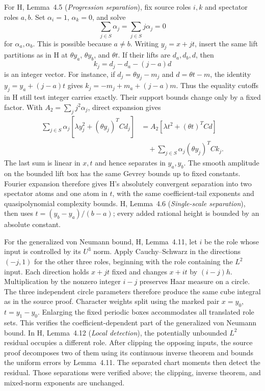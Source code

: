 For H, Lemma~4.5 (\emph{Progression separation}), fix source roles $i,k$
and spectator roles $a,b$.  Set $\alpha_i=1$, $\alpha_k=0$, and solve
\[
 \sum_{j\in S}\alpha_j=\sum_{j\in S}j\alpha_j=0
\]
for $\alpha_a,\alpha_b$.  This is possible because $a\ne b$.
Writing $y_j=x+jt$, insert the same lift partitions as in H at
$\theta y_a$, $\theta y_b$, and $\theta t$.  If their lifts are
$d_a,d_b,d$, then
\[
 k_j=d_j-d_a-(j-a)d
\]
is an integer vector.  For instance, if $d_j=\theta y_j-m_j$ and
$d=\theta t-m$, the identity $y_j=y_a+(j-a)t$ gives
$k_j=-m_j+m_a+(j-a)m$.  Thus the equality cutoffs in H still test
integer carries exactly.  Their support bounds change only by a
fixed factor.  With $A_2=\sum_jj^2\alpha_j$, direct expansion gives
\begin{equation}
 \begin{split}
 \sum_{j\in S}\alpha_j
       [\lambda y_j^2+(\theta y_j)^TCd_j]
 &=A_2[\lambda t^2+(\theta t)^TCd]\\
 &\quad+\sum_{j\in S}\alpha_j(\theta y_j)^TCk_j.
 \end{split}
 \label{eq:ll-chart-identity}
\end{equation}
The last sum is linear in $x,t$ and hence separates in $y_a,y_b$.
The smooth amplitude on the bounded lift box has the same Gevrey
bounds up to fixed constants.  Fourier expansion therefore gives
H's absolutely convergent separation into two spectator atoms and one
atom in $t$, with the same coefficient-tail exponents and
quasipolynomial complexity bounds.  H, Lemma~4.6 (\emph{Single-scale separation}), then uses $t=(y_b-y_a)/(b-a)$; every added rational height is
bounded by an absolute constant.

For the generalized von Neumann bound, H, Lemma~4.11, let $i$ be
the role whose input is controlled by its $U^3$ norm.
Apply Cauchy--Schwarz in the directions $(-j,1)$ for the other
three roles, beginning with the role containing the $L^2$ input.
Each direction holds $x+jt$ fixed and changes $x+it$ by
$(i-j)h$.  Multiplication by the nonzero integer $i-j$ preserves Haar
measure on a circle.  The three independent circle parameters
therefore produce the same cube integral as in the source proof.
Character weights split using the marked pair $x=y_0$,
$t=y_1-y_0$.  Enlarging the fixed periodic boxes accommodates all
translated role sets.  This verifies the coefficient-dependent part
of the generalized von Neumann bound.  In H, Lemma~4.12
(\emph{Local detection}), the potentially unbounded $L^2$ residual
occupies a different role.  After clipping the opposing inputs, the
source proof decomposes two of them using its continuous inverse
theorem and bounds the uniform errors by Lemma~4.11.  The separated
chart moments then detect the residual.  Those separations were
verified above; the clipping, inverse theorem, and mixed-norm
exponents are unchanged.

